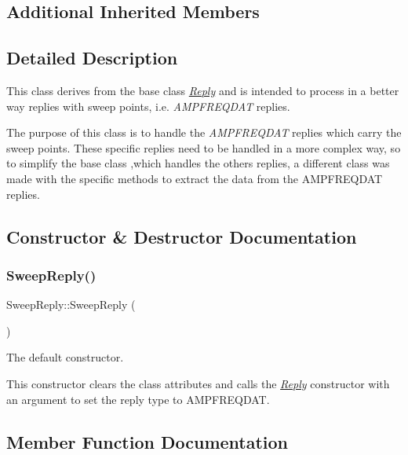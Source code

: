 \subsection*{Additional Inherited Members}


\subsection{Detailed Description}
This class derives from the base class {\itshape \hyperlink{classReply}{Reply}} and is intended to process in a better way replies with sweep points, i.\+e. {\itshape A\+M\+P\+F\+R\+E\+Q\+D\+AT} replies. 

The purpose of this class is to handle the {\itshape A\+M\+P\+F\+R\+E\+Q\+D\+AT} replies which carry the sweep points. These specific replies need to be handled in a more complex way, so to simplify the base class ,which handles the others replies, a different class was made with the specific methods to extract the data from the A\+M\+P\+F\+R\+E\+Q\+D\+AT replies. 

\subsection{Constructor \& Destructor Documentation}
\mbox{\label{classSweepReply_a27d588db63e7c9d5374cfbfc88d9bc4f}} 
\subsubsection{\texorpdfstring{Sweep\+Reply()}{SweepReply()}}
{\footnotesize\ttfamily Sweep\+Reply\+::\+Sweep\+Reply (\begin{DoxyParamCaption}{ }\end{DoxyParamCaption})}



The default constructor. 

This constructor clears the class attributes and calls the {\itshape \hyperlink{classReply}{Reply}} constructor with an argument to set the reply type to A\+M\+P\+F\+R\+E\+Q\+D\+AT. 

\subsection{Member Function Documentation}
\mbox{\label{classSweepReply_a8eff11f046d6cd2fb8c3987f889c5d11}} 
